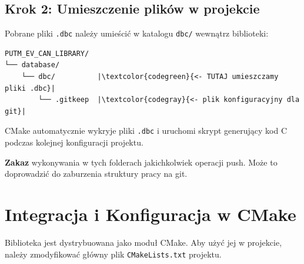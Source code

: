 \documentclass[a4paper,11pt]{article}
\begin{document}
\subsection*{Krok 2: Umieszczenie plików w projekcie}

Pobrane pliki \texttt{.dbc} należy umieścić w katalogu \texttt{dbc/} wewnątrz biblioteki:

\begin{lstlisting}[style=bashstyle, escapechar=|]
PUTM_EV_CAN_LIBRARY/
└── database/
    └── dbc/          |\textcolor{codegreen}{<- TUTAJ umieszczamy pliki .dbc}|
        └── .gitkeep  |\textcolor{codegray}{<- plik konfiguracyjny dla git}|
\end{lstlisting}

CMake automatycznie wykryje pliki \texttt{.dbc} i uruchomi skrypt generujący kod C podczas kolejnej konfiguracji projektu.

\begin{warningbox}
\textbf{Zakaz} wykonywania w tych folderach jakichkolwiek operacji push. Może to doprowadzić do zaburzenia struktury pracy na git. 
\end{warningbox}

\newpage

\section{Integracja i Konfiguracja w CMake}

Biblioteka jest dystrybuowana jako moduł CMake. Aby użyć jej w projekcie, należy zmodyfikować główny plik \texttt{CMakeLists.txt} projektu.
\end{document}
